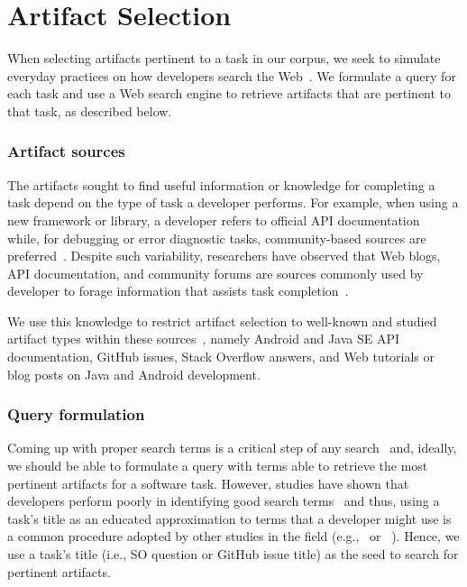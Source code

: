 
\section{Artifact Selection}
\label{cp4:corpus-artifacts}


When selecting artifacts pertinent to a task in our corpus, we seek to simulate everyday practices on how developers search the Web~\cite{rao2020, Xia2017}.
We formulate a query for each task and use a Web search engine to retrieve artifacts that are pertinent to that task, as described below.


\subsubsection{Artifact sources}



The artifacts sought to find useful information or knowledge for completing a task
 depend on the type of task a developer performs.
For example, when using a new framework or library, a developer refers to official API documentation~\cite{Li2013,robillard2011field} while, for debugging or error diagnostic tasks, community-based sources are preferred~\cite{Li2013,Breu2010}.
Despite such variability, researchers have observed that Web blogs, API documentation, and community forums are sources
commonly used by developer to forage information that assists task completion~\cite{Li2013, josyula2018}.



We use this knowledge to restrict artifact selection to well-known and studied artifact types within these sources~\cite{Starke2009,Kevic2014, Li2013}, namely Android and Java SE API documentation, GitHub issues, Stack Overflow answers, and Web tutorials or blog posts on Java and Android development.





\subsubsection{Query formulation}




Coming up with proper search terms is a critical step of any search~\cite{Haiduc2013}
and, ideally, we should be able to formulate a query with terms able to retrieve the most pertinent artifacts for a software task.
However, studies have shown that developers perform poorly in identifying good search terms~\cite{latoza2006, Starke2009,Kevic2014} and thus, using a task's title
as an educated approximation to terms that a developer might use is a common procedure adopted by other studies in the field (e.g.,~\cite{Xu2017} or ~\cite{silva2019}).
Hence, we use a task's title (i.e., SO question or GitHub issue title) as the seed to search for pertinent artifacts.



